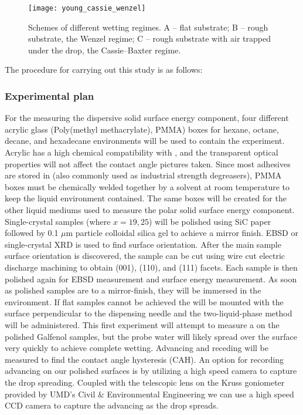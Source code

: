 \begin{figure}[h]
	\centering
	\texttt{[image: young\_cassie\_wenzel]}
	\caption{Schemes of different wetting regimes. A – flat substrate; B – rough substrate, the Wenzel regime; C – rough substrate with air trapped under the drop, the Cassie–Baxter regime.\cite{Whyman2008}}
	\label{fig:young_cassie_wenzel}
\end{figure}

The procedure for carrying out this study is as follows:
\subsubsection{Experimental plan}
\begin{outline}[enumerate]
\1 For the measuring the dispersive solid surface energy component, four different acrylic glass (Poly(methyl methacrylate), PMMA) boxes for hexane, octane, decane, and hexadecane environments will be used to contain the experiment. Acrylic has a high chemical compatibility with \nalk[s], and the transparent optical properties will not affect the contact angle pictures taken.\cite{Thermoscientific} Since most adhesives are stored in \nalk[s] (also commonly used as industrial strength degreasers), PMMA boxes must be chemically welded together by a solvent at room temperature to keep the liquid environment contained. The same boxes will be created for the other liquid mediums used to measure the polar solid surface energy component. 
\1 Single-crystal samples (\fegacomp where $x=19,25$) will be polished using SiC paper followed by 0.1 $\mu$m particle colloidal silica gel to achieve a mirror finish. EBSD or single-crystal XRD is used to find surface orientation. After the main sample surface orientation is discovered, the sample can be cut using wire cut electric discharge machining to obtain \hkl(001), \hkl(110), and \hkl(111) facets. Each sample is then polished again for EBSD measurement and surface energy measurement. As soon as polished samples are to a mirror-finish, they will be immersed in the \nalk environment.  
\1 If flat samples cannot be achieved the will be mounted with the surface perpendicular to the dispensing needle and the two-liquid-phase method will be administered. This first experiment will attempt to measure a \ca on the polished Galfenol samples, but the probe water will likely spread over the surface very quickly to achieve complete wetting. 
Advancing and receding \ca[s] will be measured to find the contact angle hysteresis (CAH). An option for recording advancing \ca on our polished surfaces is by utilizing a high speed camera to capture the drop spreading. Coupled with the telescopic lens on the Kruss goniometer provided by UMD's Civil \& Environmental Engineering we can use a high speed CCD camera to capture the advancing \ca[s] as the drop spreads. 


\end{outline}
